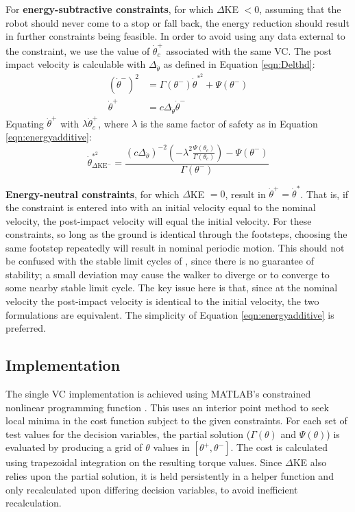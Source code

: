 For \textbf{energy-subtractive constraints}, for which $\Delta$KE $<0$, assuming that the robot should never come to a stop or fall back, the energy reduction should result in further constraints being feasible. In order to avoid using any data external to the constraint, we use the value of $\dot{\theta}^+_c$ associated with the same VC. The post impact velocity is calculable with $\Delta_{\dot{\theta}}$ as defined in Equation \ref{eqn:Delthd}:
\begin{subequations}
	\begin{align}
	\left(\dot{\theta}^-\right)^2 &= \Gamma(\theta^-)\dot{\theta}^{*^2} + \Psi(\theta^-) \\
	\dot{\theta}^+ &= c\Delta_{\dot{\theta}}\dot{\theta}^-
	\end{align}
\end{subequations}
Equating $\dot{\theta}^+$ with $\lambda\dot{\theta}^+_c$, where $\lambda$ is the same factor of safety as in Equation \ref{eqn:energyadditive}:
\begin{equation}
	\dot{\theta}_{\Delta\mathrm{KE}^-}^{*^2} = \frac{(c\Delta_{\dot{\theta}})^{-2}\left(-\lambda^2\frac{ \Psi(\theta_c)}{ \Gamma(\theta_c)}\right) - \Psi(\theta^-)} {\Gamma(\theta^-)}
\end{equation}

\textbf{Energy-neutral constraints}, for which $\Delta$KE $=0$, result in $\dot{\theta}^+ = \dot{\theta}^*$. That is, if the constraint is entered into with an initial velocity equal to the nominal velocity, the post-impact velocity will equal the initial velocity. For these constraints, so long as the ground is identical through the footsteps, choosing the same footstep repeatedly will result in nominal periodic motion. This should not be confused with the stable limit cycles of \cite{grizzle2001asymptotically, franken2008analysis}, since there is no guarantee of stability; a small deviation may cause the walker to diverge or to converge to some nearby stable limit cycle. The key issue here is that, since at the nominal velocity the post-impact velocity is identical to the initial velocity, the two formulations are equivalent. The simplicity of Equation \ref{eqn:energyadditive} is preferred.

\subsection{Implementation}
The single VC implementation is achieved using MATLAB's constrained nonlinear programming function . This uses an interior point method to seek local minima in the cost function subject to the given constraints. For each set of test values for the decision variables, the partial solution ($\Gamma(\theta)$ and $\Psi(\theta)$) is evaluated by producing a grid of $\theta$ values in $[\theta^+, \theta^-]$. The cost is calculated using trapezoidal integration on the resulting torque values. Since $\Delta$KE also relies upon the partial solution, it is held persistently in a helper function and only recalculated upon differing decision variables, to avoid inefficient recalculation.

